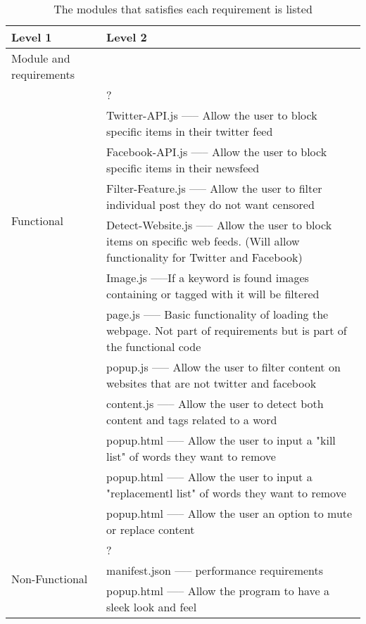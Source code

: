 \documentclass[12pt, titlepage]{article}
\begin{document}
\begin{table}[h!]
\centering
\begin{tabular}{p{} p{}}
\toprule
\textbf{Level 1} & \textbf{Level 2}\\
\midrule
{Module and requirements} & ~ \\
\midrule
\multirow{7}{0.3\textwidth}{Functional} & ?\\
& Twitter-API.js ----- Allow the user to block specific items in their twitter feed\\
& Facebook-API.js ----- Allow the user to block specific items in their newsfeed\\
&Filter-Feature.js ----- Allow the user to filter individual post they do not want censored\\
&Detect-Website.js ----- Allow the user to block items on specific web feeds. (Will allow functionality for Twitter and Facebook)\\
&Image.js -----If a keyword is found images containing or tagged with it will be filtered\\
& page.js ----- Basic functionality of loading the webpage. Not part of requirements but is part of the functional code\\
& popup.js ----- Allow the user to filter content on websites that are not twitter and facebook\\
& content.js ----- Allow the user to detect both content and tags related to a word\\
& popup.html ----- Allow the user to input a "kill list" of words they want to remove\\
& popup.html ----- Allow the user to input a "replacementl list" of words they want to remove\\
& popup.html ----- Allow the user an option to mute or replace content\\
\midrule
\multirow{3}{0.3\textwidth}{Non-Functional} & {?}\\
& manifest.json ----- performance requirements\\
& popup.html ----- Allow the program to have a sleek look and feel\\

\bottomrule
\end{tabular}
\caption{The modules that satisfies each requirement is listed}
\label{TblMH}
\end{table}
\end{document}
